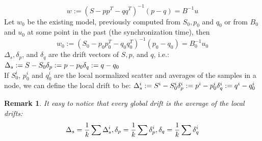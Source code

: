 \documentclass[11pt,twocolumn,varwidth=true,a4paper,fleqn]{article}
\newtheorem{remark}{Remark}
\begin{document}
\begin{equation*}
w:=(S - pp^T - qq^T)^{-1}(p-q)=B^{-1}u
\end{equation*}
Let $w_0$ be the existing model, previously computed from $S_0, p_0$ and $q_0$
or from $B_0$ and $u_0$ at some point in the past (the synchronization time),
then
\begin{equation*} 
w_0:=(S_0 - p_0p_0^T - q_0q_0^T)^{-1}(p_0-q_0)=B_0^{-1}u_0
\end{equation*}
$\Delta_s, \delta_p$, and $\delta_q$ are the drift vectors of $S, p$, and $q$, i.e.:
$
\\\Delta_s:= S - S_0
\\\delta_p:= p - p_0
\\\delta_q := q - q_0$
\\If $S_0^i$, $p_0^i$ and $q_0^i$ are the local normalized scatter and averages
of the samples in a node, we can define the local drift to be:
$
\\\Delta_s^i:= S^i - S_0^i
\\\delta_p^i:= p^i - p_0^i
\\\delta_q^i:= q^i - q_0^i
$
\begin{remark} \label{average}
It easy to notice that every global drift is the average of the local drifts:
\begin{equation*}
\Delta_s = \frac{1}{k} \sum \Delta_s^i, \\
\delta_p = \frac{1}{k} \sum \delta_p^i, \\
\delta_q = \frac{1}{k} \sum \delta_q^i 
\end{equation*}
\end{remark}
\end{document}
